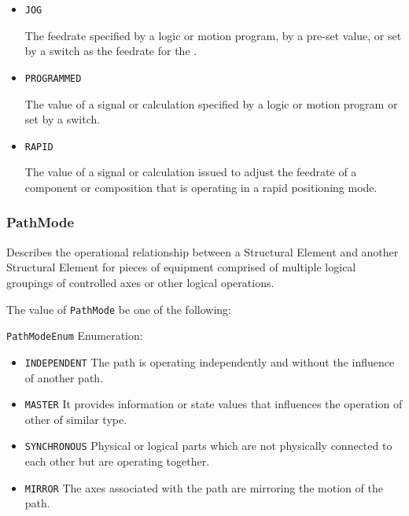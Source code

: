 \begin{itemize}

\item \texttt{JOG}


The feedrate specified by a logic or motion program, by a pre-set value, or set by a switch as the feedrate for the . 

\item \texttt{PROGRAMMED}


The value of a signal or calculation specified by a logic or motion program or set by a switch.

\item \texttt{RAPID}


The value of a signal or calculation issued to adjust the feedrate of a component or composition that is operating in a rapid positioning mode.


\end{itemize}






\subsubsection{PathMode}
\label{sec:PathMode}



Describes the operational relationship between a  \gls{Structural Element} and another  \gls{Structural Element} for pieces of equipment comprised of multiple logical groupings of controlled axes or other logical operations.


The value of \texttt{PathMode} \MUST be one of the following: 


\texttt{PathModeEnum} Enumeration:

\begin{itemize}
\item \texttt{INDEPENDENT} \newline The path is operating independently and without the influence of another path. 
\item \texttt{MASTER} \newline It provides information or state values that influences the operation of other  of similar type. 
\item \texttt{SYNCHRONOUS} \newline Physical or logical parts which are not physically connected to each other but are operating together. 
\item \texttt{MIRROR} \newline The axes associated with the path are mirroring the motion of the  path. 
\end{itemize}



